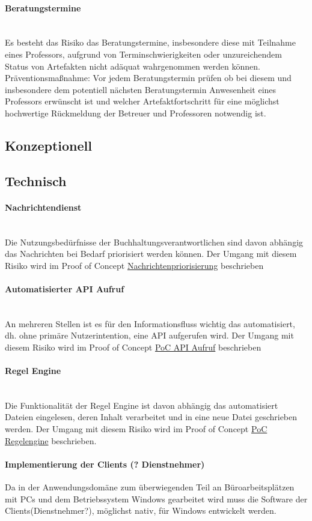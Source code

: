 \documentclass[11pt,oneside,a4paper,notitlepage]{article}
\begin{document}
\paragraph{Beratungstermine}\\
Es besteht das Risiko das Beratungstermine, insbesondere diese mit Teilnahme eines Professors, aufgrund von Terminschwierigkeiten oder unzureichendem Status von Artefakten
nicht adäquat wahrgenommen werden können.\\
Präventionsmaßnahme: Vor jedem Beratungstermin prüfen ob bei diesem und insbesondere dem potentiell nächsten Beratungstermin Anwesenheit eines Professors erwünscht ist und
welcher Artefaktfortschritt für eine möglichst hochwertige Rückmeldung der Betreuer und Professoren notwendig ist.


%
\subsection{Konzeptionell}


%
\subsection{Technisch}

\paragraph{Nachrichtendienst}\\
Die Nutzungsbedürfnisse der Buchhaltungsverantwortlichen sind davon abhängig das Nachrichten bei Bedarf priorisiert werden können.
Der Umgang mit diesem Risiko wird im Proof of Concept \href{}{Nachrichtenpriorisierung} beschrieben

\paragraph{Automatisierter API Aufruf}\\
An mehreren Stellen ist es für den Informationsfluss wichtig das automatisiert, dh. ohne primäre Nutzerintention, eine API aufgerufen wird.
Der Umgang mit diesem Risiko wird im Proof of Concept \href{}{PoC API Aufruf} beschrieben

\paragraph{Regel Engine}\\
Die Funktionalität der Regel Engine ist davon abhängig das automatisiert Dateien eingelesen, deren Inhalt verarbeitet und in eine neue Datei geschrieben werden.
Der Umgang mit diesem Risiko wird im Proof of Concept \href{}{PoC Regelengine} beschrieben.

\paragraph{Implementierung der Clients (? Dienstnehmer)}
Da in der Anwendungsdomäne zum überwiegenden Teil an Büroarbeitsplätzen mit PCs und dem Betriebssystem Windows gearbeitet wird muss die Software der Clients(Dienstnehmer?), möglichst
nativ, für Windows entwickelt werden.
\end{document}

